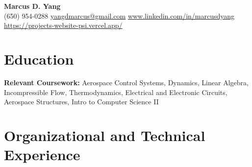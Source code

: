\newcommand{\entrygap}{\vspace{2pt}}



\begin{center}
  {\fontsize{17}{20}\selectfont\bfseries Marcus D. Yang}\\[2pt]
  {\footnotesize (650) 954-0288 \textbar{} \href{mailto:yangdmarcus@gmail.com}{yangdmarcus@gmail.com} \textbar{} \href{https://www.linkedin.com/in/marcusdyang}{www.linkedin.com/in/marcusdyang} \textbar{} \href{https://projects-website-psi.vercel.app/}{https://projects-website-psi.vercel.app/}}
\end{center}

\section{Education}
\textbf{Relevant Coursework:} Aerospace Control Systems, Dynamics, Linear Algebra, Incompressible Flow, Thermodynamics, Electrical and Electronic Circuits, Aerospace Structures, Intro to Computer Science II

\section{Organizational and Technical Experience}

